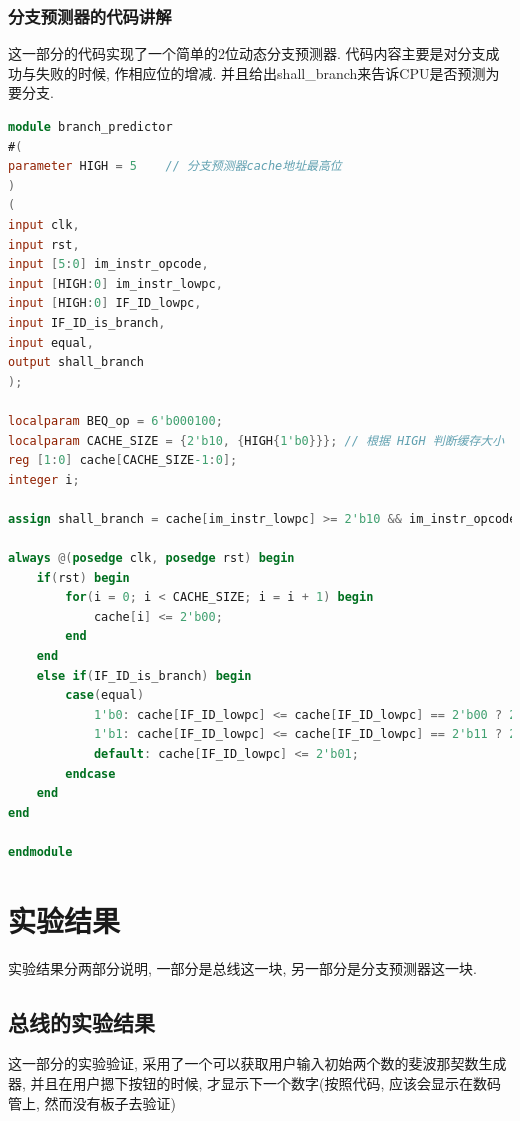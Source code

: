 \documentclass[UTF8]{article}
\begin{document}
\subsubsection{分支预测器的代码讲解}
这一部分的代码实现了一个简单的2位动态分支预测器. 代码内容主要是对分支成功与失败的时候, 作相应位的增减. 并且给出shall\_branch来告诉CPU是否预测为要分支.
\begin{lstlisting}[language=verilog]
module branch_predictor
#(
parameter HIGH = 5    // 分支预测器cache地址最高位
)
(
input clk,
input rst, 
input [5:0] im_instr_opcode,
input [HIGH:0] im_instr_lowpc,
input [HIGH:0] IF_ID_lowpc,
input IF_ID_is_branch,
input equal,
output shall_branch
);

localparam BEQ_op = 6'b000100;
localparam CACHE_SIZE = {2'b10, {HIGH{1'b0}}}; // 根据 HIGH 判断缓存大小
reg [1:0] cache[CACHE_SIZE-1:0];
integer i;

assign shall_branch = cache[im_instr_lowpc] >= 2'b10 && im_instr_opcode == BEQ_op ? 1'b1 : 1'b0;

always @(posedge clk, posedge rst) begin
    if(rst) begin
        for(i = 0; i < CACHE_SIZE; i = i + 1) begin
            cache[i] <= 2'b00;
        end
    end
    else if(IF_ID_is_branch) begin
        case(equal)
            1'b0: cache[IF_ID_lowpc] <= cache[IF_ID_lowpc] == 2'b00 ? 2'b00 : cache[IF_ID_lowpc] - 2'b01;
            1'b1: cache[IF_ID_lowpc] <= cache[IF_ID_lowpc] == 2'b11 ? 2'b11 : cache[IF_ID_lowpc] + 2'b01;
            default: cache[IF_ID_lowpc] <= 2'b01;
        endcase
    end
end

endmodule
\end{lstlisting}
\section{实验结果}
实验结果分两部分说明, 一部分是总线这一块, 另一部分是分支预测器这一块.
\subsection{总线的实验结果}
这一部分的实验验证, 采用了一个可以获取用户输入初始两个数的斐波那契数生成器, 并且在用户摁下按钮的时候, 才显示下一个数字(按照代码, 应该会显示在数码管上, 然而没有板子去验证)
\end{document}
